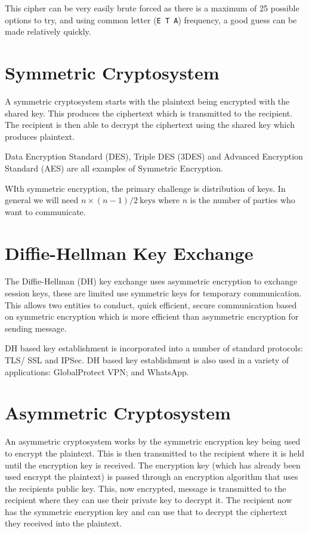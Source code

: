 This cipher can be very easily brute forced as there is a maximum of 25 possible options to try, and using common letter (\verb|E T A|) frequency, a good guess can be made relatively quickly. 


\section*{Symmetric Cryptosystem}
A symmetric cryptosystem starts with the plaintext being encrypted with the shared key. This produces the ciphertext which is transmitted to the recipient. The recipient is then able to decrypt the ciphertext using the shared key which produces plaintext. 

Data Encryption Standard (DES), Triple DES (3DES) and Advanced Encryption Standard (AES) are all examples of Symmetric Encryption.

WIth symmetric encryption, the primary challenge is distribution of keys. In general we will need $n \times (n-1)/2\ \mathrm{keys}$ where $n$ is the number of parties who want to communicate. 

\section*{Diffie-Hellman Key Exchange}
The Diffie-Hellman (DH) key exchange uses asymmetric encryption to exchange session keys, these are limited use symmetric keys for temporary communication. This allows two entities to conduct, quick efficient, secure communication based on symmetric encryption which is more efficient than asymmetric encryption for sending message.

DH based key establishment is incorporated into a number of standard protocols: TLS/ SSL and IPSec. DH based key establishment is also used in a variety of applications: GlobalProtect VPN; and WhatsApp. 

\section*{Asymmetric Cryptosystem}
An asymmetric cryptosystem works by the symmetric encryption key being used to encrypt the plaintext. This is then transmitted to the recipient where it is held until the encryption key is received. The encryption key (which has already been used encrypt the plaintext) is passed through an encryption algorithm that uses the recipients public key. This, now encrypted, message is transmitted to the recipient where they can use their private key to decrypt it. The recipient now has the symmetric encryption key and can use that to decrypt the ciphertext they received into the plaintext.

